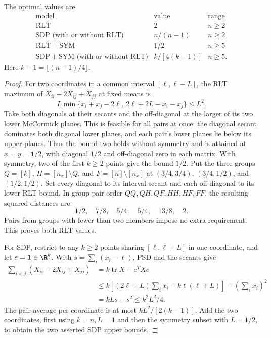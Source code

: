 \begin{proposition}\label{prop:packing-values}
The optimal values are
\[
\begin{array}{c|c|c}
\text{model}&\text{value}&\text{range}\\\hline
\mathrm{RLT}&2&n\ge2\\
\mathrm{SDP}\text{ (with or without RLT)}&n/(n-1)&n\ge2\\
\mathrm{RLT+SYM}&1/2&n\ge5\\
\mathrm{SDP+SYM}\text{ (with or without RLT)}&k/[4(k-1)]&n\ge5.
\end{array}
\]
Here $k-1=\lfloor(n-1)/4\rfloor$.
\end{proposition}
\begin{proof}
For two coordinates in a common interval $[\ell,\ell+L]$, the RLT
maximum of $X_{ii}-2X_{ij}+X_{jj}$ at fixed means is
\[
 L\min\{x_i+x_j-2\ell,\ 2\ell+2L-x_i-x_j\}\le L^2.
\]
Take both diagonals at their secants and the off-diagonal at the larger
of its two lower McCormick planes. This is feasible for all pairs at once:
the diagonal secant dominates both diagonal lower planes, and each pair's
lower planes lie below its upper planes. Thus the bound two holds without
symmetry and is attained at $x=y=\boldsymbol1/2$, with diagonal $1/2$
and off-diagonal zero in each matrix.
With symmetry, two of the first $k\ge2$ points give the bound $1/2$.
Put the three groups $Q=[k]$, $H=[n_x]\setminus Q$, and
$F=[n]\setminus[n_x]$ at $(3/4,3/4)$, $(3/4,1/2)$, and $(1/2,1/2)$.
Set every diagonal to its interval secant and each off-diagonal to its
lower RLT bound. In group-pair order $QQ,QH,QF,HH,HF,FF$, the resulting
squared distances are
\[
 1/2,\quad7/8,\quad5/4,\quad5/4,\quad13/8,\quad2.
\]
Pairs from groups with fewer than two members impose no extra requirement.
This proves both RLT values.

For SDP, restrict to any $k\ge2$ points sharing $[\ell,\ell+L]$ in one
coordinate, and let $e=\boldsymbol1\in\R^k$. With
$s=\sum_i(x_i-\ell)$, PSD and the secants give
\begin{align*}
 \sum_{i<j}(X_{ii}-2X_{ij}+X_{jj})
 &=k\operatorname{tr}X-e^TXe\\
 &\le k[(2\ell+L)\sum_i x_i-k\ell(\ell+L)]-(\sum_i x_i)^2\\
 &=kLs-s^2\le k^2L^2/4.
\end{align*}
The pair average per coordinate is at most $kL^2/[2(k-1)]$.
Add the two coordinates, first using $k=n,L=1$ and then the symmetry
subset with $L=1/2$, to obtain the two asserted SDP upper bounds.


\end{proof}
